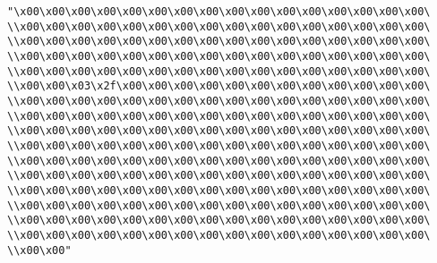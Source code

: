 \verb|"\x00\x00\x00\x00\x00\x00\x00\x00\x00\x00\x00\x00\x00\x00\x00\x00\|\newline
\verb|\\x00\x00\x00\x00\x00\x00\x00\x00\x00\x00\x00\x00\x00\x00\x00\x00\|\newline
\verb|\\x00\x00\x00\x00\x00\x00\x00\x00\x00\x00\x00\x00\x00\x00\x00\x00\|\newline
\verb|\\x00\x00\x00\x00\x00\x00\x00\x00\x00\x00\x00\x00\x00\x00\x00\x00\|\newline
\verb|\\x00\x00\x00\x00\x00\x00\x00\x00\x00\x00\x00\x00\x00\x00\x00\x00\|\newline
\verb|\\x00\x00\x03\x2f\x00\x00\x00\x00\x00\x00\x00\x00\x00\x00\x00\x00\|\newline
\verb|\\x00\x00\x00\x00\x00\x00\x00\x00\x00\x00\x00\x00\x00\x00\x00\x00\|\newline
\verb|\\x00\x00\x00\x00\x00\x00\x00\x00\x00\x00\x00\x00\x00\x00\x00\x00\|\newline
\verb|\\x00\x00\x00\x00\x00\x00\x00\x00\x00\x00\x00\x00\x00\x00\x00\x00\|\newline
\verb|\\x00\x00\x00\x00\x00\x00\x00\x00\x00\x00\x00\x00\x00\x00\x00\x00\|\newline
\verb|\\x00\x00\x00\x00\x00\x00\x00\x00\x00\x00\x00\x00\x00\x00\x00\x00\|\newline
\verb|\\x00\x00\x00\x00\x00\x00\x00\x00\x00\x00\x00\x00\x00\x00\x00\x00\|\newline
\verb|\\x00\x00\x00\x00\x00\x00\x00\x00\x00\x00\x00\x00\x00\x00\x00\x00\|\newline
\verb|\\x00\x00\x00\x00\x00\x00\x00\x00\x00\x00\x00\x00\x00\x00\x00\x00\|\newline
\verb|\\x00\x00\x00\x00\x00\x00\x00\x00\x00\x00\x00\x00\x00\x00\x00\x00\|\newline
\verb|\\x00\x00\x00\x00\x00\x00\x00\x00\x00\x00\x00\x00\x00\x00\x00\x00\|\newline
\verb|\\x00\x00"|\newline
